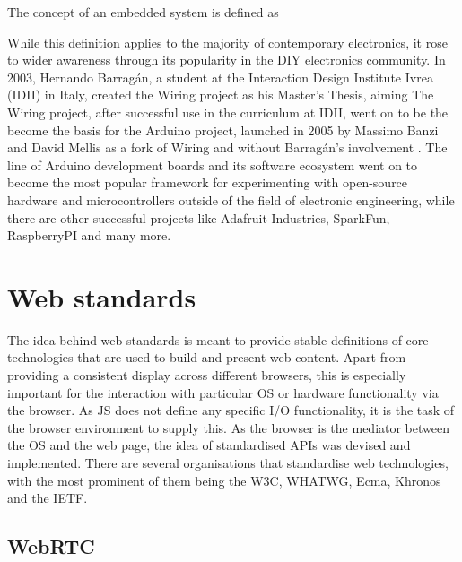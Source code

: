 The concept of an embedded system is defined as 

While this definition applies to the majority of contemporary electronics, it rose to wider awareness through its popularity in the \ac{DIY} electronics community. In 2003, Hernando Barragán, a student at the Interaction Design Institute Ivrea (IDII) in Italy, created the Wiring project as his Master's Thesis, aiming  The Wiring project, after successful use in the curriculum at IDII, went on to be the become the basis for the Arduino project, launched in 2005 by Massimo Banzi and David Mellis as a fork of Wiring and without Barragán's involvement \parencite{arduinoHistory}. The line of Arduino development boards and its software ecosystem went on to become the most popular framework for experimenting with open-source hardware and microcontrollers outside of the field of electronic engineering, while there are other successful projects like Adafruit Industries, SparkFun, RaspberryPI and many more.


\section{Web standards}
\label{section:webStandards}

The idea behind web standards is meant to provide stable definitions of core technologies that are used to build and present web content. Apart from providing a consistent display across different browsers, this is especially important for the interaction with particular \ac{OS} or hardware functionality via the browser. As \ac{JS} does not define any specific \ac{I/O} functionality, it is the task of the browser environment to supply this. As the browser is the mediator between the \ac{OS} and the web page, the idea of standardised \ac{API}s was devised and implemented. There are several organisations that standardise web technologies, with the most prominent of them being the \ac{W3C}, \ac{WHATWG}, Ecma, Khronos and the \ac{IETF}.

\subsection{WebRTC}

